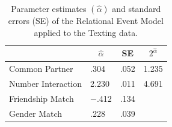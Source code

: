 \begin{table}[t!]
\caption{Parameter estimates $(\hat{\alpha})$ and standard errors (SE) of the Relational Event Model applied to the Texting data. \label{tbl:results_sms}} 
\begin{center}
\begin{tabular}{llll}
\hline
\multicolumn{1}{l}{}&\multicolumn{1}{c}{$\hat{\alpha}$}&\multicolumn{1}{c}{SE}&\multicolumn{1}{c}{$2^{\hat{\alpha}}$}\tabularnewline
\hline
Common Partner&.304&.052&1.235\tabularnewline
Number Interaction&2.230&.011&4.691\tabularnewline
Friendship Match&$-$.412&.134&\tabularnewline
Gender Match&.228&.039&\tabularnewline
\hline
\end{tabular}\end{center}
\end{table}
